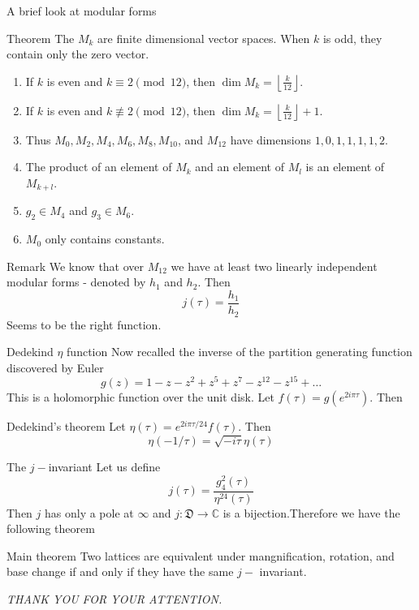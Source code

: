 \documentclass[pdf]{beamer}
\begin{document}
\begin{frame}{A brief look at modular forms}
    \begin{block}{Theorem}
        The $M_k$ are finite dimensional vector spaces. When $k$ is odd, they contain only the zero vector.
        \begin{enumerate}
            \item If $k$ is even and $k \equiv 2 \pmod{12}$, then $\dim M_k = \left\lfloor \frac{k}{12} \right\rfloor$.
            \item If $k$ is even and $k \not\equiv 2 \pmod{12}$, then $\dim M_k = \left\lfloor \frac{k}{12} \right\rfloor + 1$.
            \item Thus $M_0, M_2, M_4, M_6, M_8, M_{10}$, and $M_{12}$ have dimensions $1, 0, 1, 1, 1, 1, 2$.
            \item The product of an element of $M_k$ and an element of $M_l$ is an element of $M_{k+l}$.
            \item $g_2 \in M_4$ and $g_3 \in M_6$.
            \item $M_0$ only contains constants.
        \end{enumerate}
    \end{block}
\end{frame}
\begin{frame}{Remark}
    We know that over $M_{12}$ we have at least two linearly independent modular forms - denoted by $h_1$ and $h_2$. Then
    \[ j(\tau) = \dfrac{h_1}{h_2}\]
    Seems to be the right function.
\end{frame}
\begin{frame}{Dedekind $\eta$ function}
    Now recalled the inverse of the partition generating function discovered by Euler
    \[g(z) = 1-z-z^2+z^5+z^7 - z^{12}-z^{15}+\ldots\]
    This is a holomorphic function over the unit disk. Let $f(\tau) = g(e^{2i\pi\tau})$. Then
    \begin{block}{Dedekind's theorem}
        Let $\eta(\tau) = e^{2i\pi\tau/24}f(\tau)$. Then
        \[\eta(-1/\tau) = \sqrt{-i\tau}\eta(\tau)\]
    \end{block}
\end{frame}
\begin{frame}{The $j-$invariant}
    Let us define
    \[j(\tau) = \dfrac{g_4^2(\tau)}{\eta^{24}(\tau)}\]
    Then $j$ has only a pole at $\infty$ and $j \colon \mathfrak{D} \to \mathbb{C}$ is a bijection.\pause Therefore we have the following theorem
    \begin{block}{Main theorem}
        Two lattices are equivalent under mangnification, rotation, and base change if and only if they have the same $j-$ invariant.
    \end{block}
\end{frame}

\begin{frame}
    \begin{center}
        \textit{THANK YOU FOR YOUR ATTENTION.}
    \end{center}
\end{frame}
\end{document}

